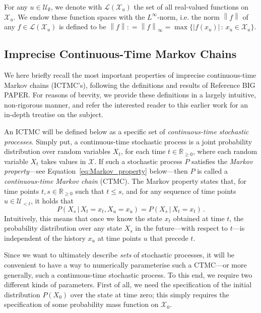 \documentclass[twoside,11pt]{article}
\newcommand{\reals}{\mathbb{R}}
\newcommand{\realsnonneg}{\reals_{\geq 0}}
\newcommand{\states}{\mathcal{X}}
\newcommand{\gambles}{\mathcal{L}}
\newcommand{\norm}[1]{\left\lVert #1 \right\rVert}
\newcommand{\abs}[1]{\left\vert #1 \right\vert}
\newcommand{\coloneqq}{:\!=}
\begin{document}
For any $u\in\mathcal{U}_\emptyset$, we denote with $\gambles(\states_u)$ the set of all real-valued functions on $\states_u$. We endow these function spaces with the $L^\infty$-norm, i.e. the norm $\norm{f}$ of any $f\in\gambles(\states_u)$ is defined to be $\norm{f}\coloneqq\norm{f}_\infty=\max\{\abs{f(x_u)}\,:\,x_u\in\states_u\}$.

\subsection{Imprecise Continuous-Time Markov Chains}

We here briefly recall the most important properties of imprecise continuous-time Markov chains (ICTMC's), following the definitions and results of Reference BIG PAPER. For reasons of brevity, we provide these definitions in a largely intuitive, non-rigorous manner, and refer the interested reader to this earlier work for an in-depth treatise on the subject.

An ICTMC will be defined below as a specific set of \emph{continuous-time stochastic processes}. Simply put, a continuous-time stochastic process is a joint probability distribution over random variables $X_t$, for each time $t\in\realsnonneg$, where each random variable $X_t$ takes values in $\states$. If such a stochastic process $P$ satisfies the \emph{Markov property}---see Equation~\eqref{eq:Markov_property} below---then $P$ is called a \emph{continuous-time Markov chain} (CTMC). The Markov property states that, for time points $t,s\in\realsnonneg$ such that $t\leq s$, and for any sequence of time points $u\in\mathcal{U}_{<t}$, it holds that
\begin{equation}\label{eq:Markov_property}
P(X_s\,\vert\,X_t=x_t,X_u=x_u) = P(X_s\,\vert\,X_t=x_t)\,.
\end{equation}
Intuitively, this means that once we know the state $x_t$ obtained at time $t$, the probability distribution over any state $X_s$ in the future---with respect to $t$---is independent of the history $x_u$ at time points $u$ that precede $t$.

Since we want to ultimately describe \emph{sets} of stochastic processes, it will be convenient to have a way to numerically parameterise such a CTMC---or more generally, such a continuous-time stochastic process. To this end, we require two different kinds of parameters. First of all, we need the specification of the initial distribution $P(X_0)$ over the state at time zero; this simply requires the specification of some probability mass function on $\states_0$.
\end{document}

